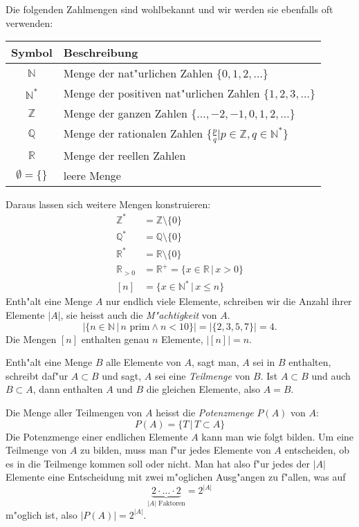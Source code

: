 Die folgenden Zahlmengen sind wohlbekannt und wir werden sie ebenfalls
oft verwenden:
\begin{center}
\begin{tabular}{|c|l|}
\hline
Symbol&Beschreibung\\
\hline
\index{nat\"urliche Zahlen}
$\mathbb N$&Menge der nat"urlichen Zahlen $\{0,1,2,\dots\}$\\
$\mathbb N^*$&Menge der positiven nat"urlichen Zahlen $\{1,2,3,\dots\}$\\
\index{ganze Zahlen}
$\mathbb Z$&Menge der ganzen Zahlen $\{\dots,-2,-1,0,1,2,\dots\}$\\
\index{rationale Zahlen}
$\mathbb Q$&Menge der rationalen Zahlen $\{\frac{p}{q}|p\in\mathbb Z,q\in\mathbb N^*\}$\\
\index{reelle Zahlen}
$\mathbb R$&Menge der reellen Zahlen\\
\index{leere Menge}
$\emptyset=\{\}$&leere Menge\\
\hline
\end{tabular}
\end{center}
Daraus lassen sich weitere Mengen konstruieren:
\begin{align*}
\mathbb Z^*&=\mathbb Z\setminus \{0\}\\
\mathbb Q^*&=\mathbb Q\setminus \{0\}\\
\mathbb R^*&=\mathbb R\setminus \{0\}\\
\mathbb R_{> 0}&=\mathbb R^+=\{x\in\mathbb R\,|\,x>0\}\\
[n]&=\{x\in \mathbb N^*\,|\,x\le n\}
\end{align*}
Enth"alt eine Menge $A$ nur endlich viele Elemente, schreiben wir die Anzahl
ihrer Elemente $|A|$, sie heisst auch die {\em M"achtigkeit} von $A$.
\[
|\{n\in\mathbb N\,|\,\text{$n$ prim}\wedge n<10\}|=|\{2,3,5,7\}|=4.
\]
Die Mengen $[n]$ enthalten genau $n$ Elemente, $|[n]|=n$.

Enth"alt eine Menge $B$ alle Elemente von $A$, sagt man, $A$ sei in $B$
enthalten, schreibt daf"ur $A\subset B$ und sagt, $A$ sei eine
{\em Teilmenge} von $B$. Ist $A\subset B$ und auch
$B\subset A$, dann enthalten $A$ und $B$ die gleichen Elemente, also
$A=B$.

Die Menge aller Teilmengen von $A$ heisst die {\em Potenzmenge} $P(A)$ von $A$:
\[
P(A)=\{ T\,|\,T\subset A\}
\]
Die Potenzmenge einer endlichen Elemente $A$ kann man wie folgt bilden.
Um eine Teilmenge von $A$ zu bilden, muss man f"ur jedes Elemente
von $A$ entscheiden, ob es in die Teilmenge kommen soll oder nicht.
Man hat also f"ur jedes der $|A|$ Elemente eine Entscheidung mit zwei
m"oglichen Ausg"angen zu f"allen, was auf
\[
\underbrace{2\cdot\dots\cdot 2}_{\text{$|A|$ Faktoren}}=2^{|A|}
\]
m"oglich ist, also $|P(A)|=2^{|A|}$.

